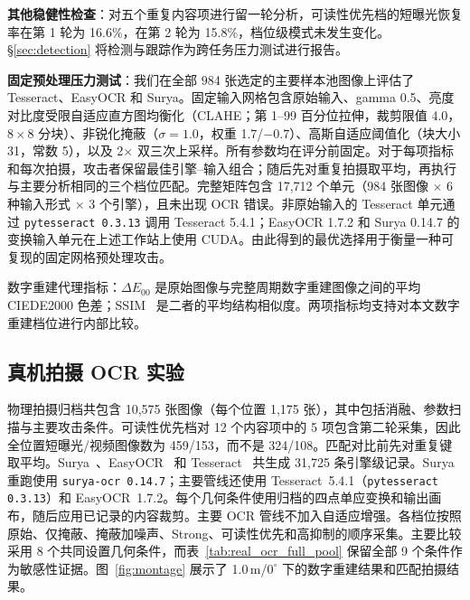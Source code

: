\documentclass{ieeeaccess}
\begin{document}
\textbf{其他稳健性检查}：对五个重复内容项进行留一轮分析，可读性优先档的短曝光恢复率在第 1 轮为 16.6\%，在第 2 轮为 15.8\%，档位级模式未发生变化。\S\ref{sec:detection} 将检测与跟踪作为跨任务压力测试进行报告。

\textbf{固定预处理压力测试}：我们在全部 984 张选定的主要样本池图像上评估了 Tesseract、EasyOCR 和 Surya。固定输入网格包含原始输入、gamma 0.5、亮度对比度受限自适应直方图均衡化（CLAHE；第 1--99 百分位拉伸，裁剪限值 4.0，$8\times8$ 分块）、非锐化掩蔽（$\sigma=1.0$，权重 1.7/$-0.7$）、高斯自适应阈值化（块大小 31，常数 5），以及 2$\times$ 双三次上采样。所有参数均在评分前固定。对于每项指标和每次拍摄，攻击者保留最佳引擎--输入组合；随后先对重复拍摄取平均，再执行与主要分析相同的三个档位匹配。完整矩阵包含 17,712 个单元（984 张图像 $\times$ 6 种输入形式 $\times$ 3 个引擎），且未出现 OCR 错误。非原始输入的 Tesseract 单元通过 \texttt{pytesseract 0.3.13} 调用 Tesseract 5.4.1；EasyOCR 1.7.2 和 Surya 0.14.7 的变换输入单元在上述工作站上使用 CUDA。由此得到的最优选择用于衡量一种可复现的固定网格预处理攻击。

数字重建代理指标：$\Delta E_{00}$ 是原始图像与完整周期数字重建图像之间的平均 CIEDE2000 色差；SSIM~\cite{b_wang2004} 是二者的平均结构相似度。两项指标均支持对本文数字重建档位进行内部比较。

\subsection{真机拍摄 OCR 实验}
\label{sec:real_capture}

物理拍摄归档共包含 10,575 张图像（每个位置 1,175 张），其中包括消融、参数扫描与主要攻击条件。可读性优先档对 12 个内容项中的 5 项包含第二轮采集，因此全位置短曝光/视频图像数为 459/153，而不是 324/108。匹配对比前先对重复键取平均。Surya~\cite{b_surya2024}、EasyOCR~\cite{b_easyocr2020} 和 Tesseract~\cite{b_smith2007} 共生成 31,725 条引擎级记录。Surya 重跑使用 \texttt{surya-ocr 0.14.7}；主要管线还使用 Tesseract~5.4.1（\texttt{pytesseract 0.3.13}）和 EasyOCR~1.7.2。每个几何条件使用归档的四点单应变换和输出画布，随后应用已记录的内容裁剪。主要 OCR 管线不加入自适应增强。各档位按照原始、仅掩蔽、掩蔽加噪声、Strong、可读性优先和高抑制的顺序采集。主要比较采用 8 个共同设置几何条件，而表~\ref{tab:real_ocr_full_pool} 保留全部 9 个条件作为敏感性证据。图~\ref{fig:montage} 展示了 1.0\,m/$0^{\circ}$ 下的数字重建结果和匹配拍摄结果。
\end{document}
